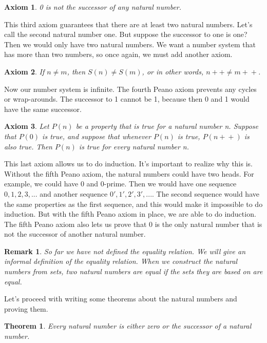 \documentclass{article}
\newtheorem{axiom}{Axiom}
\newtheorem{theorem}{Theorem}
\newtheorem{remark}{Remark}
\newcommand{\inc}[1]{#1\!+\!+}
\begin{document}
\begin{axiom}
0 is not the successor of any natural number.
\end{axiom}

This third axiom guarantees that there are at least two natural numbers. Let's call the second natural number one. But suppose the successor to one is one? Then we would only have two natural numbers. We want a number system that has more than two numbers, so once again, we must add another axiom.

\begin{axiom}
If $n \neq m$, then $S(n) \neq S(m)$, or in other words, $\inc{n} \neq \inc{m}$.
\end{axiom}

Now our number system is infinite. The fourth Peano axiom prevents any cycles or wrap-arounds. The successor to 1 cannot be 1, because then 0 and 1 would have the same successor. 

\begin{axiom}
Let $P(n)$ be a property that is true for a natural number n. Suppose that $P(0)$ is true, and suppose that whenever $P(n)$ is true, $P(\inc{n})$ is also true. Then $P(n)$ is true for every natural number n.
\end{axiom}

This last axiom allows us to do induction. It's important to realize why this is. \\

Without the fifth Peano axiom, the natural numbers could have two heads. For example, we could have 0 and 0-prime. Then we would have one sequence $0, 1, 2, 3, ...$ and another sequence $0', 1', 2', 3', ...$. The second sequence would have the same properties as the first sequence, and this would make it impossible to do induction. But with the fifth Peano axiom in place, we are able to do induction. The fifth Peano axiom also lets us prove that 0 is the only natural number that is not the successor of another natural number.

\begin{remark}
So far we have not defined the equality relation. We will give an informal definition of the equality relation. When we construct the natural numbers from sets, two natural numbers are equal if the sets they are based on are equal.
\end{remark}

Let's proceed with writing some theorems about the natural numbers and proving them.

\begin{theorem}
Every natural number is either zero or the successor of a natural number.
\end{theorem}
\end{document}
